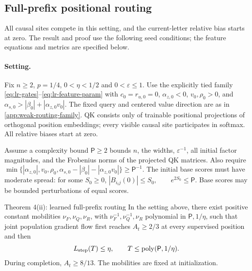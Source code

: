\subsection{Full-prefix positional routing}
\label{app:weak-seeded-full-prefix-routing}

All causal sites compete in this setting, and the current-letter relative bias
starts at zero. The result and proof use the following seed conditions; the
feature equations and metrics are specified below.



\paragraph{Setting.}\label{app:lr-setting}
Fix $n\ge2$, $p=1/4$, $0<\eta<1/2$ and $0<\varepsilon\le1$.
Use the explicitly tied family \eqref{eq:lr-gates}--\eqref{eq:lr-feature-param}
with $c_0=r_{u,0}=0$, $\alpha_{z,0}<0$, $v_0,\rho_0>0$, and
$\alpha_{s,0}>|\beta_0|+|\alpha_{z,0}v_0|$. The fixed query and centered value direction
are as in \cref{app:weak-routing-family}. QK consists only of trainable
positional projections of orthogonal position embeddings; every visible
causal site participates in softmax. All relative biases start at zero.

Assume a complexity bound $\mathsf P\ge2$ bounds $n$, the widths,
$\varepsilon^{-1}$, all initial factor magnitudes, and the Frobenius norms
of the projected QK matrices. Also require
 $\min\{|\alpha_{z,0}|,v_0,\rho_0,\alpha_{s,0}-|\beta_0|-|\alpha_{z,0}v_0|\}\ge \mathsf P^{-1}.$ 
The initial base scores must have moderate spread: for some $S_0\ge0$,
 $|B_{i_tj}(0)|\le S_0,\qquad e^{2S_0}\le \mathsf P.$ 
Base scores may be bounded perturbations of equal scores.

\begin{restated}{Theorem 4(ii): learned full-prefix routing}
In the setting above, there exist positive constant mobilities
$\nu_F,\nu_Q,\nu_R$, with $\nu_F^{-1},\nu_Q^{-1},\nu_R$
polynomial in $\mathsf P,1/\eta$, such that joint population gradient flow first
reaches $A_t\ge2/3$ at every supervised position and then
\begin{equation}\label{eq:lr-finite-theorem}
 L_{\mathrm{step}}(T)\le\eta,\qquad T\le\operatorname{poly}(\mathsf P,1/\eta).
\end{equation}
During completion, $A_t\ge8/13$. The mobilities are fixed at initialization.
\end{restated}




